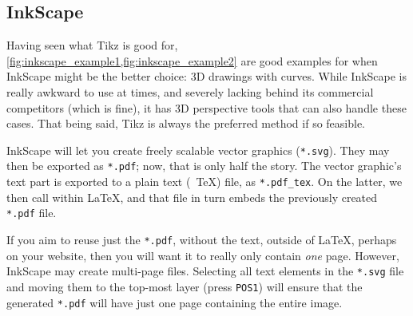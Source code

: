\subsection{InkScape}
Having seen what Tikz is good for, \cref{fig:inkscape_example1,fig:inkscape_example2} are good examples for when InkScape might be the better choice: 3D drawings with curves.
While InkScape is really awkward to use at times, and severely lacking behind its commercial competitors (which is fine), it has 3D perspective tools that can also handle these cases.
That being said, Tikz is always the preferred method if so feasible.

InkScape will let you create freely scalable vector graphics (\texttt{*.svg}).
They may then be exported as \texttt{*.pdf}; now, that is only half the story.
The vector graphic's text part is exported to a plain text (\ \TeX) file, as \verb|*.pdf_tex|.
On the latter, we then call \verb|| within \LaTeX{}, and that file in turn embeds the previously created \texttt{*.pdf} file.

If you aim to reuse just the \texttt{*.pdf}, without the text, outside of \LaTeX{}, perhaps on your website, then you will want it to really only contain \emph{one} page.
However, InkScape may create multi-page files.
Selecting all text elements in the \texttt{*.svg} file and moving them to the top-most layer (press \texttt{POS1}) will ensure that the generated \texttt{*.pdf} will have just one page containing the entire image.
\begin{figure}\ContinuedFloat*
{}%
{%
	\small
	\def\svgwidth{0.6\figurewidth}
	
}%
\end{figure}%
\begin{figure}\ContinuedFloat
	{%
		\small
		\def\svgwidth{0.6\figurewidth}
		
	}%
\end{figure}%
